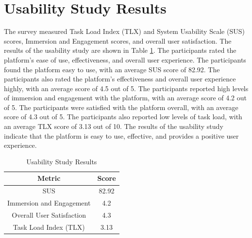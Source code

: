 \section{Usability Study Results}
The survey measured Task Load Index (TLX) and System Usability Scale (SUS) scores, Immersion and Engagement scores, and overall user satisfaction. The results of the usability study are shown in Table \ref{tab:usability}. The participants rated the platform's ease of use, effectiveness, and overall user experience. The participants found the platform easy to use, with an average SUS score of 82.92. The participants also rated the platform's effectiveness and overall user experience highly, with an average score of 4.5 out of 5. The participants reported high levels of immersion and engagement with the platform, with an average score of 4.2 out of 5. The participants were satisfied with the platform overall, with an average score of 4.3 out of 5. The participants also reported low levels of task load, with an average TLX score of 3.13 out of 10. The results of the usability study indicate that the platform is easy to use, effective, and provides a positive user experience.


\begin{table}[]
    \centering
    \begin{tabular}{|c|c|}
    \hline
    \textbf{Metric} & \textbf{Score} \\ \hline
    SUS & 82.92 \\ \hline
    Immersion and Engagement & 4.2 \\ \hline
    Overall User Satisfaction & 4.3 \\ \hline
    Task Load Index (TLX) & 3.13 \\ \hline
    \end{tabular}
    \caption{Usability Study Results}
    \label{tab:usability}
\end{table}